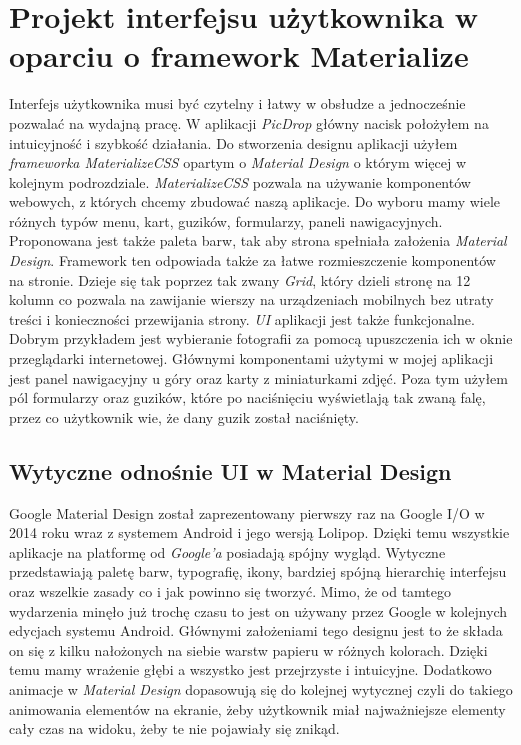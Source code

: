 \documentclass[brudnopis]{xmgr}
\begin{document}
\section{Projekt interfejsu użytkownika w oparciu o framework Materialize}
	Interfejs użytkownika musi być czytelny i łatwy w obsłudze a jednocześnie pozwalać na wydajną pracę. W aplikacji \textit{PicDrop} główny nacisk położyłem na intuicyjność i szybkość działania. Do stworzenia designu aplikacji użyłem \textit{frameworka MaterializeCSS} opartym o \textit{Material Design} o którym więcej w kolejnym podrozdziale. \textit{MaterializeCSS} pozwala na używanie komponentów webowych, z których chcemy zbudować naszą aplikacje. Do wyboru mamy wiele różnych typów menu, kart, guzików, formularzy, paneli nawigacyjnych. Proponowana jest także paleta barw, tak aby strona spełniała założenia \textit{Material Design}. Framework ten odpowiada także za łatwe rozmieszczenie komponentów na stronie. Dzieje się tak poprzez tak zwany \textit{Grid}, który dzieli stronę na 12 kolumn co pozwala na zawijanie wierszy na urządzeniach mobilnych bez utraty treści i konieczności przewijania strony. \textit{UI} aplikacji jest także funkcjonalne. Dobrym przykładem jest wybieranie fotografii za pomocą upuszczenia ich w oknie przeglądarki internetowej. Głównymi komponentami użytymi w mojej aplikacji jest panel nawigacyjny u góry oraz karty z miniaturkami zdjęć. Poza tym użyłem pól formularzy oraz guzików, które po naciśnięciu wyświetlają tak zwaną falę, przez co użytkownik wie, że dany guzik został naciśnięty.
\subsection{Wytyczne odnośnie UI w Material Design}
Google Material Design został zaprezentowany pierwszy raz na Google I/O w 2014 roku wraz z systemem Android i jego wersją Lolipop.  Dzięki temu wszystkie aplikacje na platformę od \textit{Google’a} posiadają spójny wygląd. Wytyczne przedstawiają paletę barw, typografię, ikony, bardziej spójną hierarchię interfejsu oraz wszelkie zasady co i jak powinno się tworzyć. Mimo, że od tamtego wydarzenia minęło już trochę czasu to jest on używany przez Google w kolejnych edycjach systemu Android. Głównymi założeniami tego designu jest to że składa on się z kilku  nałożonych na siebie warstw papieru w różnych kolorach. Dzięki temu mamy wrażenie głębi a wszystko jest przejrzyste i intuicyjne. Dodatkowo animacje w \textit{Material Design} dopasowują się do kolejnej wytycznej czyli do takiego animowania elementów na ekranie, żeby użytkownik miał najważniejsze elementy cały czas na widoku, żeby te nie pojawiały się znikąd. 
\end{document}
